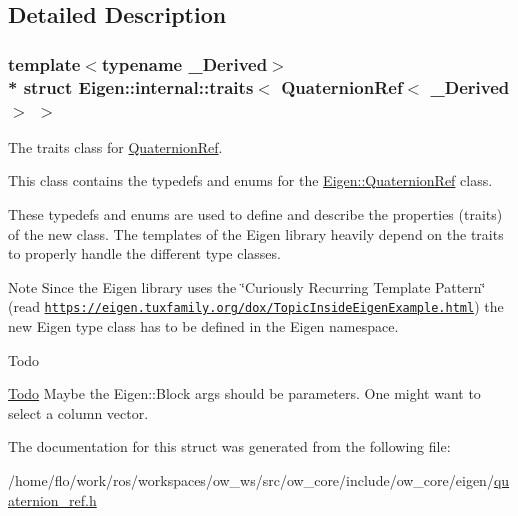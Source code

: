 \subsection{Detailed Description}
\subsubsection*{template$<$typename \+\_\+\+Derived$>$\\*
struct Eigen\+::internal\+::traits$<$ Quaternion\+Ref$<$ \+\_\+\+Derived $>$ $>$}

The traits class for \hyperlink{classEigen_1_1QuaternionRef}{Quaternion\+Ref}. 

This class contains the typedefs and enums for the \hyperlink{classEigen_1_1QuaternionRef}{Eigen\+::\+Quaternion\+Ref} class.

These typedefs and enums are used to define and describe the properties (traits) of the new class. The templates of the Eigen library heavily depend on the traits to properly handle the different type classes.

\begin{DoxyNote}{Note}
Since the Eigen library uses the \char`\"{}\+Curiously Recurring Template Pattern\char`\"{} (read \href{https://eigen.tuxfamily.org/dox/TopicInsideEigenExample.html}{\tt https\+://eigen.\+tuxfamily.\+org/dox/\+Topic\+Inside\+Eigen\+Example.\+html}) the new Eigen type class has to be defined in the Eigen namespace.
\end{DoxyNote}
\begin{DoxyRefDesc}{Todo}
\item[\hyperlink{todo__todo000001}{Todo}]Maybe the Eigen\+::\+Block args should be parameters. One might want to select a column vector. \end{DoxyRefDesc}


The documentation for this struct was generated from the following file\+:\begin{DoxyCompactItemize}
\item 
/home/flo/work/ros/workspaces/ow\+\_\+ws/src/ow\+\_\+core/include/ow\+\_\+core/eigen/\hyperlink{eigen_2quaternion__ref_8h}{quaternion\+\_\+ref.\+h}\end{DoxyCompactItemize}
